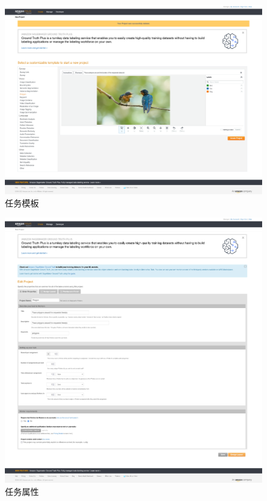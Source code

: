\begin{figure}[h!]
    \centering
    \includegraphics[width=0.9\linewidth]{imgs/template.png}
    \caption{任务模板}
    \label{fig:template}
\end{figure}

\newpage

\begin{figure}[h!]
    \centering
    \includegraphics[width=0.9\linewidth]{imgs/properties.png}
    \caption{任务属性}
    \label{fig:properties}
\end{figure}

\newpage

